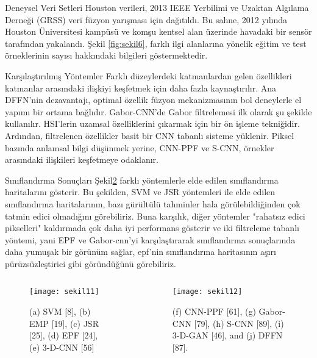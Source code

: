 \documentclass{beamer}
\begin{document}
\begin{frame}{Deneysel Veri Setleri}
	Houston verileri, 2013 IEEE Yerbilimi ve Uzaktan Algılama Derneği (GRSS) veri füzyon yarışması için dağıtıldı. Bu sahne, 2012 yılında Houston Üniversitesi kampüsü ve komşu kentsel alan üzerinde havadaki bir sensör tarafından yakalandı. Şekil \ref{fig:sekil6}, farklı ilgi alanlarına yönelik eğitim ve test örneklerinin sayısı hakkındaki bilgileri göstermektedir.
\end{frame}


\begin{frame}{Karşılaştırılmış Yöntemler}
Farklı düzeylerdeki katmanlardan gelen özellikleri katmanlar arasındaki ilişkiyi keşfetmek için daha fazla kaynaştırılır. Ana DFFN’nin dezavantajı, optimal özellik füzyon mekanizmasının bol deneylerle el yapımı bir ortama bağlıdır. Gabor-CNN’de Gabor filtrelemesi ilk olarak şu şekilde kullanılır. HSI’lerin uzamsal özelliklerini çıkarmak için bir ön işleme tekniğidir. Ardından, filtrelenen özellikler basit bir CNN tabanlı sisteme yüklenir. Piksel bazında anlamsal bilgi düşünmek yerine, CNN-PPF ve S-CNN, örnekler arasındaki ilişkileri keşfetmeye odaklanır.
\end{frame}

\begin{frame}{Sınıflandırma Sonuçları}
			Şekil\ref{fig:sekil8} farklı yöntemlerle elde edilen sınıflandırma haritalarını gösterir. Bu şekilden, SVM ve JSR yöntemleri ile elde edilen sınıflandırma haritalarının, bazı gürültülü tahminler hala görülebildiğinden çok tatmin edici olmadığını görebiliriz. Buna karşılık, diğer yöntemler "rahatsız edici pikselleri" kaldırmada çok daha iyi performans gösterir ve iki filtreleme tabanlı yöntemi, yani EPF ve Gabor-cnn'yi karşılaştırarak sınıflandırma sonuçlarında daha yumuşak bir görünüm sağlar, epf'nin sınıflandırma haritasının aşırı pürüzsüzleştirici gibi göründüğünü görebiliriz.
\end{frame}

\begin{frame}
	\begin{columns}
		\begin{column}{0.5\textwidth}
			\begin{figure}
				\texttt{[image: sekil11]}
				\label{fig:sekil7}
				\caption{(a) SVM [8], (b) EMP [19], (c) JSR [25], (d) EPF [24], (e) 3-D-CNN [56]}
			\end{figure}
		\end{column}
		\begin{column}{0.5\textwidth}
			\begin{figure}
				\texttt{[image: sekil12]}
				\label{fig:sekil8} 
				\caption{(f) CNN-PPF [61], (g) Gabor-CNN [79], (h) S-CNN [89], (i) 3-D-GAN [46], and (j) DFFN [87].}
			\end{figure}
		\end{column}
	\end{columns}
\end{frame}
\end{document}
